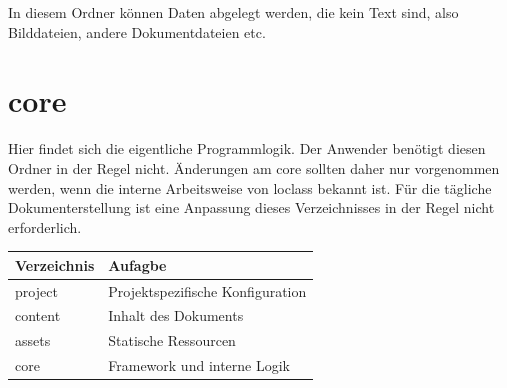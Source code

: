 In diesem Ordner können Daten abgelegt werden, die kein Text sind, also Bilddateien, andere Dokumentdateien etc.

\section{core}

Hier findet sich die eigentliche Programmlogik. Der Anwender benötigt diesen Ordner in der Regel nicht. Änderungen am core sollten daher nur vorgenommen werden, wenn die interne Arbeitsweise von loclass bekannt ist. Für die tägliche Dokumenterstellung ist eine Anpassung dieses Verzeichnisses in der Regel nicht erforderlich.

\begin{tabular}{ll}
    \toprule
    \textbf{Verzeichnis} & \textbf{Aufagbe} \\
    \midrule
    project & Projektspezifische Konfiguration \\
    content & Inhalt des Dokuments \\
    assets & Statische Ressourcen \\
    core & Framework und interne Logik\\
    \bottomrule
\end{tabular}
